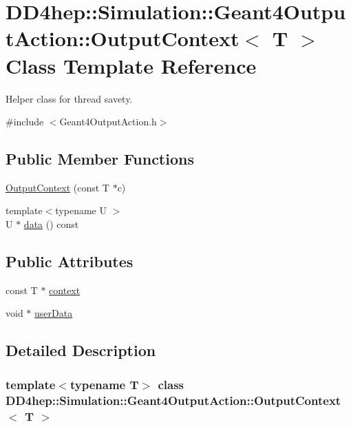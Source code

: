\hypertarget{class_d_d4hep_1_1_simulation_1_1_geant4_output_action_1_1_output_context}{
\section{DD4hep::Simulation::Geant4OutputAction::OutputContext$<$ T $>$ Class Template Reference}
\label{class_d_d4hep_1_1_simulation_1_1_geant4_output_action_1_1_output_context}
}


Helper class for thread savety.  


{\ttfamily \#include $<$Geant4OutputAction.h$>$}\subsection*{Public Member Functions}
\begin{DoxyCompactItemize}
\item 
\hyperlink{class_d_d4hep_1_1_simulation_1_1_geant4_output_action_1_1_output_context_a17ae6b51c22363bc840aaa02ea106c9f}{OutputContext} (const T $\ast$c)
\item 
{\footnotesize template$<$typename U $>$ }\\U $\ast$ \hyperlink{class_d_d4hep_1_1_simulation_1_1_geant4_output_action_1_1_output_context_a6945f25ebd357ba286eef2fc6b73a21c}{data} () const 
\end{DoxyCompactItemize}
\subsection*{Public Attributes}
\begin{DoxyCompactItemize}
\item 
const T $\ast$ \hyperlink{class_d_d4hep_1_1_simulation_1_1_geant4_output_action_1_1_output_context_aba6a758066ac2a69e7300ac168bf89b5}{context}
\item 
void $\ast$ \hyperlink{class_d_d4hep_1_1_simulation_1_1_geant4_output_action_1_1_output_context_aac8a4f21a40d123eedfffecd9b6ea96a}{userData}
\end{DoxyCompactItemize}


\subsection{Detailed Description}
\subsubsection*{template$<$typename T$>$ class DD4hep::Simulation::Geant4OutputAction::OutputContext$<$ T $>$}

